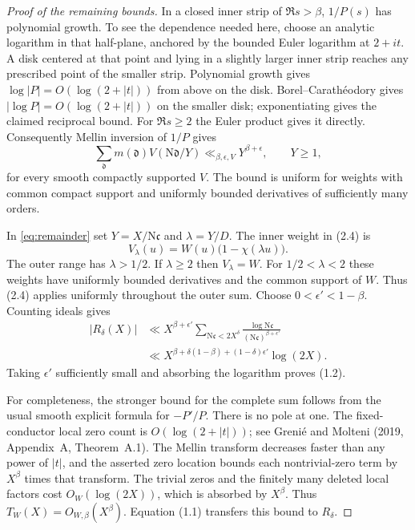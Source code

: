 \documentclass[11pt]{article}
\newcommand{\N}{\mathrm N}
\begin{document}
\begin{proof}[Proof of the remaining bounds]
In a closed inner strip of $\Re s>\beta$, $1/P(s)$ has
polynomial growth. To see the dependence needed here, choose an
analytic logarithm in that half-plane, anchored by the bounded Euler
logarithm at $2+it$. A disk centered at that point and lying in a
slightly larger inner strip reaches any prescribed point of the
smaller strip. Polynomial growth gives
$\log|P|=O(\log(2+|t|))$ from above on the disk.
Borel--Carath\'eodory gives
$|\log P|=O(\log(2+|t|))$ on the smaller disk; exponentiating
gives the claimed reciprocal bound. For $\Re s\ge2$ the Euler
product gives it directly.
Consequently Mellin inversion of $1/P$ gives
\[
 \sum_{\mathfrak d}m(\mathfrak d)V(\N\mathfrak d/Y)
       \ll_{\beta,\epsilon,V}Y^{\beta+\epsilon},\qquad Y\ge1,
                                                               \tag{2.4}
\]
for every smooth compactly supported $V$.
The bound is uniform for weights with common compact support
and uniformly bounded derivatives of sufficiently many orders.

In \eqref{eq:remainder} set $Y=X/\N\mathfrak c$ and
$\lambda=Y/D$. The inner weight in (2.4) is
\[
 V_\lambda(u)=W(u)\bigl(1-\chi(\lambda u)\bigr).
\]
The outer range has $\lambda>1/2$. If $\lambda\ge2$ then
$V_\lambda=W$. For $1/2<\lambda<2$ these weights have uniformly
bounded derivatives and the common support of $W$.
Thus (2.4) applies uniformly throughout the outer sum.
Choose $0<\epsilon'<1-\beta$. Counting ideals gives
\begin{align*}
 |R_\delta(X)|
 &\ll X^{\beta+\epsilon'}
    \sum_{\N\mathfrak c<2X^\delta}
       \frac{\log\N\mathfrak c}{(\N\mathfrak c)^{\beta+\epsilon'}}\\
 &\ll X^{\beta+\delta(1-\beta)+(1-\delta)\epsilon'}\log(2X).
\end{align*}
Taking $\epsilon'$ sufficiently small and absorbing the logarithm
proves (1.2).

For completeness, the stronger bound for the complete sum follows
from the usual smooth explicit formula for $-P'/P$.
There is no pole at one. The fixed-conductor local zero count is
$O(\log(2+|t|))$; see Greni\'e and Molteni (2019, Appendix~A,
Theorem~A.1). The Mellin transform decreases faster than any
power of $|t|$, and the asserted zero location bounds each
nontrivial-zero term by $X^\beta$ times that transform.
The trivial zeros and the finitely many deleted local factors
cost $O_W(\log(2X))$, which is absorbed by $X^\beta$.
Thus $T_W(X)=O_{W,\beta}(X^\beta)$.
Equation (1.1) transfers this bound to $R_\delta$.
\end{proof}
\end{document}
